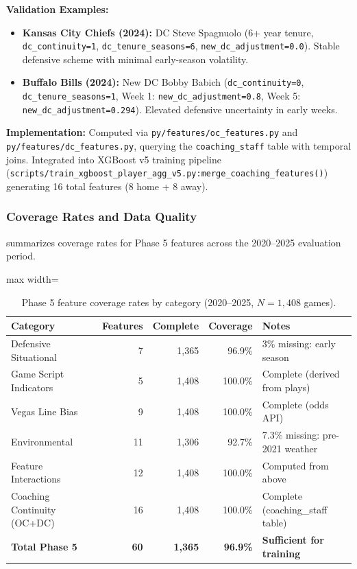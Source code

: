 \noindent\textbf{Validation Examples:}
\begin{itemize}
  \item \textbf{Kansas City Chiefs (2024):} DC Steve Spagnuolo (6+ year tenure, \texttt{dc\_continuity=1}, \texttt{dc\_tenure\_seasons=6}, \texttt{new\_dc\_adjustment=0.0}). Stable defensive scheme with minimal early-season volatility.
  \item \textbf{Buffalo Bills (2024):} New DC Bobby Babich (\texttt{dc\_continuity=0}, \texttt{dc\_tenure\_seasons=1}, Week 1: \texttt{new\_dc\_adjustment=0.8}, Week 5: \texttt{new\_dc\_adjustment=0.294}). Elevated defensive uncertainty in early weeks.
\end{itemize}

\noindent\textbf{Implementation:} Computed via \texttt{py/features/oc\_features.py} and \texttt{py/features/dc\_features.py}, querying the \texttt{coaching\_staff} table with temporal joins. Integrated into XGBoost v5 training pipeline (\texttt{scripts/train\_xgboost\_player\_agg\_v5.py:merge\_coaching\_features()}) generating 16 total features (8 home + 8 away).

\subsubsection{Coverage Rates and Data Quality}

 summarizes coverage rates for Phase 5 features across the 2020--2025 evaluation period.

\begin{table}[h]
  \centering
  \small
  \caption{Phase 5 feature coverage rates by category (2020--2025, $N=1{,}408$ games).}
  \label{tab:phase5-coverage}
  \begin{adjustbox}{max width=\textwidth}
  \begin{tabular}{@{} l r r r l @{}}
    \toprule
    \textbf{Category} & \textbf{Features} & \textbf{Complete} & \textbf{Coverage} & \textbf{Notes} \\
    \midrule
    Defensive Situational & 7 & 1,365 & 96.9\% & 3\% missing: early season \\
    Game Script Indicators & 5 & 1,408 & 100.0\% & Complete (derived from plays) \\
    Vegas Line Bias & 9 & 1,408 & 100.0\% & Complete (odds API) \\
    Environmental & 11 & 1,306 & 92.7\% & 7.3\% missing: pre-2021 weather \\
    Feature Interactions & 12 & 1,408 & 100.0\% & Computed from above \\
    Coaching Continuity (OC+DC) & 16 & 1,408 & 100.0\% & Complete (coaching\_staff table) \\
    \midrule
    \textbf{Total Phase 5} & \textbf{60} & \textbf{1,365} & \textbf{96.9\%} & \textbf{Sufficient for training} \\
    \bottomrule
  \end{tabular}
  \end{adjustbox}
\end{table}


